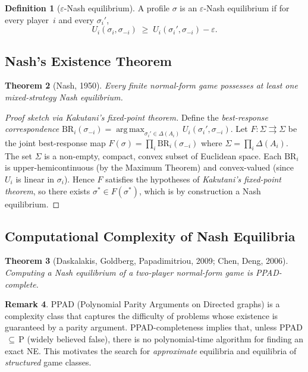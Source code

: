 \documentclass[11pt,a4paper]{article}
\theoremstyle{plain}
\newtheorem{theorem}{Theorem}[section]
\theoremstyle{definition}
\newtheorem{definition}[theorem]{Definition}
\newtheorem{remark}[theorem]{Remark}
\newcommand{\br}{\mathrm{BR}}
\DeclareMathOperator*{\argmax}{arg\,max}
\begin{document}
\begin{definition}[$\varepsilon$-Nash equilibrium]
A profile $\sigma$ is an $\varepsilon$-Nash equilibrium if for every
player~$i$ and every $\sigma_i'$,
\[
  U_i(\sigma_i, \sigma_{-i}) \;\geq\; U_i(\sigma_i', \sigma_{-i}) - \varepsilon.
\]
\end{definition}

\subsection{Nash's Existence Theorem}

\begin{theorem}[Nash, 1950]\label{thm:nash}
Every finite normal-form game possesses at least one mixed-strategy Nash
equilibrium.
\end{theorem}

\begin{proof}[Proof sketch via Kakutani's fixed-point theorem]
Define the \emph{best-response correspondence}
$\br_i(\sigma_{-i}) = \argmax_{\sigma_i' \in \Delta(A_i)}
U_i(\sigma_i', \sigma_{-i})$.  Let $F : \Sigma \rightrightarrows \Sigma$
be the joint best-response map
$F(\sigma) = \prod_i \br_i(\sigma_{-i})$ where
$\Sigma = \prod_i \Delta(A_i)$.  The set $\Sigma$ is a non-empty,
compact, convex subset of Euclidean space.  Each $\br_i$ is
upper-hemicontinuous (by the Maximum Theorem) and convex-valued (since
$U_i$ is linear in $\sigma_i$).  Hence $F$ satisfies the hypotheses of
\emph{Kakutani's fixed-point theorem}, so there exists
$\sigma^* \in F(\sigma^*)$, which is by construction a Nash equilibrium.
\end{proof}

\subsection{Computational Complexity of Nash Equilibria}

\begin{theorem}[Daskalakis, Goldberg, Papadimitriou, 2009; Chen, Deng, 2006]
Computing a Nash equilibrium of a two-player normal-form game is
\emph{PPAD-complete}.
\end{theorem}

\begin{remark}
PPAD (Polynomial Parity Arguments on Directed graphs) is a complexity
class that captures the difficulty of problems whose existence is
guaranteed by a parity argument.  PPAD-completeness implies that, unless
PPAD$\,\subseteq\,$P (widely believed false), there is no polynomial-time
algorithm for finding an exact NE.  This motivates the search for
\emph{approximate} equilibria and equilibria of \emph{structured} game
classes.
\end{remark}
\end{document}
